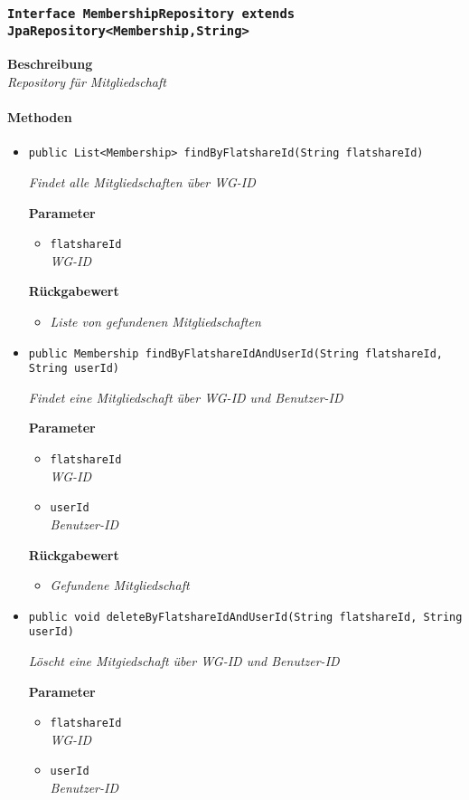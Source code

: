      \subsubsection{\texttt{Interface MembershipRepository extends JpaRepository<Membership,String>}}
     \textbf{Beschreibung} \\
     \textit{Repository für Mitgliedschaft}
     \paragraph*{Methoden}
     \begin{itemize}
     	\item{\texttt{public List<Membership> findByFlatshareId(String flatshareId)}}
     	
     	\textit{Findet alle Mitgliedschaften über WG-ID}
     	
     	\textbf{Parameter}
     	\begin{itemize}
     		\item\texttt{flatshareId}\\
     		\textit{WG-ID}
     	\end{itemize}
     	
     	\textbf{Rückgabewert}
     	\begin{itemize}
     		\item\textit{Liste von gefundenen Mitgliedschaften}
     	\end{itemize}
     
     \item{\texttt{public Membership findByFlatshareIdAndUserId(String flatshareId, String userId)}}
     	
     	\textit{Findet eine Mitgliedschaft über WG-ID und Benutzer-ID}
     	
     	\textbf{Parameter}
     	\begin{itemize}
     		\item\texttt{flatshareId}\\
     		\textit{WG-ID}
     		\item\texttt{userId}\\
     		\textit{Benutzer-ID}
     	\end{itemize}
     
     	\textbf{Rückgabewert}
     	\begin{itemize}
     		\item\textit{Gefundene Mitgliedschaft}
     	\end{itemize}
     
     \item{\texttt{public void deleteByFlatshareIdAndUserId(String flatshareId, String userId)}}
     	
     	\textit{Löscht eine Mitgiedschaft über WG-ID und Benutzer-ID}
     	
     	\textbf{Parameter}
     	\begin{itemize}
     		\item\texttt{flatshareId}\\
     		\textit{WG-ID}
     		\item\texttt{userId}\\
     		\textit{Benutzer-ID}
     	\end{itemize}
     \end{itemize}
